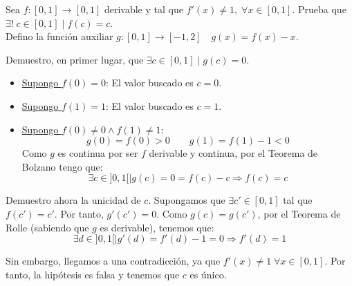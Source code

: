 \documentclass[12pt]{article}
\begin{document}
\begin{ejercicio}
    Sea $f:[0,1]\to [0,1]$ derivable y tal que $f'(x)\neq 1,\;\forall x\in [0,1]$. Prueba que $\exists!\; c\in [0,1] \mid f(c)=c$.\\

    Defino la función auxiliar $g:[0,1]\to[-1, 2] \quad g(x)=f(x)-x$.
    
    Demuestro, en primer lugar, que $\exists c\in [0,1] \mid g(c)=0$. 
    \begin{itemize}
        \item \underline{Supongo $f(0)=0$}: El valor buscado es $c=0$.
        \item \underline{Supongo $f(1)=1$}: El valor buscado es $c=1$.
        \item \underline{Supongo $f(0)\neq 0 \land f(1)\neq 1$}:
        \begin{equation*}
            g(0)=f(0)>0 \qquad g(1)=f(1)-1<0
        \end{equation*}
        Como $g$ es continua por ser $f$ derivable y continua, por el Teorema de Bolzano tengo que:
        \begin{equation*}
            \exists c\in ]0,1[\mid g(c)=0=f(c)-c \Longrightarrow f(c)=c
        \end{equation*}
    \end{itemize}

    Demuestro ahora la unicidad de $c$. Supongamos que $\exists c'\in [0,1]$ tal que $f(c')=c'$. Por tanto, $g'(c')=0$. Como $g(c)=g(c')$, por el Teorema de Rolle (sabiendo que $g$ es derivable), tenemos que:
    \begin{equation*}
        \exists d\in ]0,1[\mid g'(d)=f'(d)-1=0 \Longrightarrow f'(d)=1
    \end{equation*}

    Sin embargo, llegamos a una contradicción, ya que $f'(x)\neq 1 \;\forall x\in [0,1]$. Por tanto, la hipótesis es falsa y tenemos que $c$ es único.
\end{ejercicio}
\end{document}
